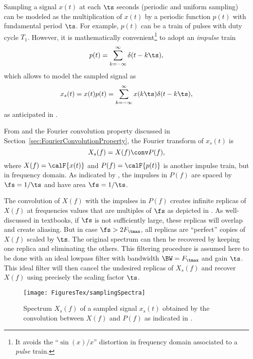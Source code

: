Sampling a signal $x(t)$ at each $\ts$ seconds (periodic and uniform sampling) can be modeled as the multiplication of $x(t)$ by a periodic function $p(t)$ with fundamental period $\ts$. For example, $p(t)$ can be a train of pulses with duty cycle $T_1$. However, it is mathematically convenient\footnote{It avoids the ``$\sin(x)/x$'' distortion in frequency domain associated to a \emph{pulse} train.} to adopt an \emph{impulse} train
\begin{equation}
p(t) = \sum_{k=-\infty}^\infty \delta(t-k \ts),
\label{eq:pulseTrain}
\end{equation}
which allows to model the sampled signal as
\begin{equation}
x_s(t) = x(t) p(t) = \sum_{k=-\infty}^\infty x(k \ts) \delta(t-k \ts),
\label{eq:sampledSignalGeneralRevisited}
\end{equation}
as anticipated in .

From  and the Fourier convolution property discussed in
Section~\ref{sec:FourierConvolutionProperty}, the Fourier transform of $x_s(t)$ is
\begin{equation}
X_s(f) = X(f) \conv P(f),
\label{eq:sampledSignalGeneralRevisitedFrequency}
\end{equation}
where $X(f)=\calF \{ x(t) \}$ and $P(f)=\calF \{ p(t) \}$ is another impulse train, but in frequency domain. As indicated by , the impulses in $P(f)$ are spaced by $\fs=1/\ts$ and have area $\fs=1/\ts$.

The convolution of $X(f)$ with the impulses in $P(f)$ creates infinite replicas of $X(f)$ at frequencies values that are multiples of $\fs$ as depicted in . As well-discussed in textbooks, if $\fs$ is not sufficiently large, these replicas will overlap and create aliasing. But in case $\fs > 2 F_\tmax$, all replicas are ``perfect'' copies of $X(f)$ scaled by $\ts$. The original spectrum can then be recovered by keeping one replica and eliminating the others. This filtering procedure is assumed here to be done with an ideal lowpass filter with bandwidth $\BW = F_\tmax$ and gain $\ts$. This ideal filter will then cancel the undesired replicas of $X_s(f)$ and recover $X(f)$ using precisely the scaling factor $\ts$.

\begin{figure}
\centering
\texttt{[image: FiguresTex/samplingSpectra]}
\caption{Spectrum $X_s(f)$ of a sampled signal $x_s(t)$ obtained by the convolution between $X(f)$ and $P(f)$ as indicated in .\label{fig:samplingSpectra}}
\end{figure}

